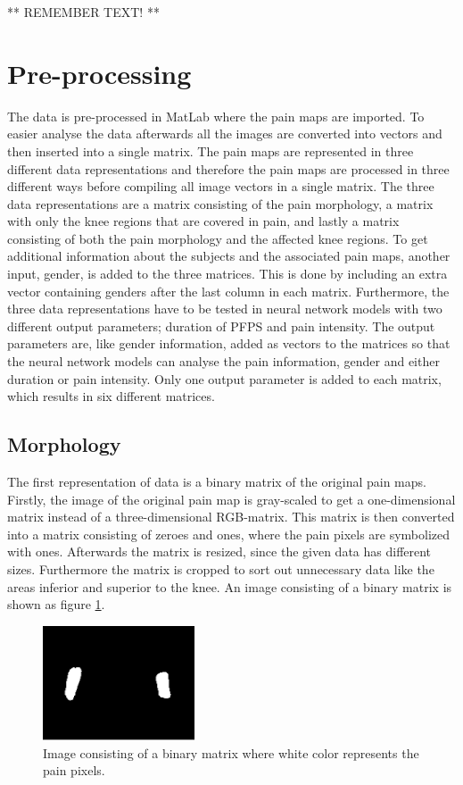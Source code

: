 ** REMEMBER TEXT! **

\section{Pre-processing}
The data is pre-processed in MatLab where the pain maps are imported. To easier analyse the data afterwards all the images are converted into vectors and then inserted into a single matrix. The pain maps are represented in three different data representations and therefore the pain maps are processed in three different ways before compiling all image vectors in a single matrix. 
The three data representations are a matrix consisting of the pain morphology, a matrix with only the knee regions that are covered in pain, and lastly a matrix consisting of both the pain morphology and the affected knee regions. 
To get additional information about the subjects and the associated pain maps, another input, gender, is added to the three matrices. This is done by including an extra vector containing genders after the last column in each matrix. 
Furthermore, the three data representations have to be tested in neural network models with two different output parameters; duration of PFPS and pain intensity. The output parameters are, like gender information, added as vectors to the matrices so that the neural network models can analyse the pain information, gender and either duration or pain intensity. Only one output parameter is added to each matrix, which results in six different matrices.

\subsection{Morphology} \label{sec:Morph}
The first representation of data is a binary matrix of the original pain maps. 
Firstly, the image of the original pain map is gray-scaled to get a one-dimensional matrix instead of a three-dimensional RGB-matrix. This matrix is then converted into a matrix consisting of zeroes and ones, where the pain pixels are symbolized with ones. Afterwards the matrix is resized, since the given data has different sizes. Furthermore the matrix is cropped to sort out unnecessary data like the areas inferior and superior to the knee. An image consisting of a binary matrix is shown as figure \ref{fig:cropbin7}.

\begin{figure} [H]
\centering
\includegraphics[width=0.4\textwidth]{figures/cropbin7}
\caption{Image consisting of a binary matrix where white color represents the pain pixels.}
\label{fig:cropbin7}
\end{figure}

